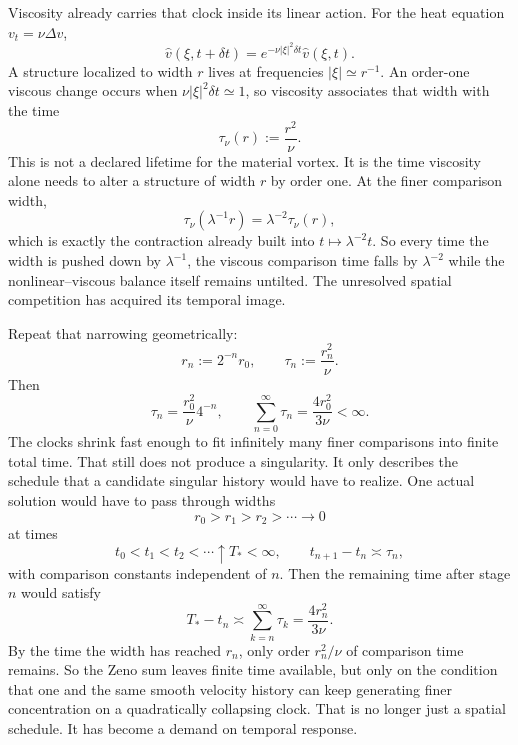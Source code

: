Viscosity already carries that clock inside its linear action.
For the heat equation \(v_t=\nu\Delta v\),
\[
  \widehat v(\xi,t+\delta t)
  =
  e^{-\nu|\xi|^2\delta t}\widehat v(\xi,t).
\]
A structure localized to width \(r\) lives at frequencies \(|\xi|\simeq r^{-1}\).
An order-one viscous change occurs when \(\nu|\xi|^2\delta t\simeq1\), so viscosity associates that width with the time
\[
  \tau_\nu(r)
  :=
  \frac{r^2}{\nu}.
\]
This is not a declared lifetime for the material vortex.
It is the time viscosity alone needs to alter a structure of width \(r\) by order one.
At the finer comparison width,
\[
  \tau_\nu(\lambda^{-1}r)
  =
  \lambda^{-2}\tau_\nu(r),
\]
which is exactly the contraction already built into \(t\mapsto\lambda^{-2}t\).
So every time the width is pushed down by \(\lambda^{-1}\), the viscous comparison time falls by \(\lambda^{-2}\) while the nonlinear--viscous balance itself remains untilted.
The unresolved spatial competition has acquired its temporal image.


Repeat that narrowing geometrically:
\[
  r_n:=2^{-n}r_0,
  \qquad
  \tau_n:=\frac{r_n^2}{\nu}.
\]
Then
\[
  \tau_n
  =
  \frac{r_0^2}{\nu}4^{-n},
  \qquad
  \sum_{n=0}^{\infty}\tau_n
  =
  \frac{4r_0^2}{3\nu}
  <
  \infty.
\]
The clocks shrink fast enough to fit infinitely many finer comparisons into finite total time.
That still does not produce a singularity.
It only describes the schedule that a candidate singular history would have to realize.
One actual solution would have to pass through widths
\[
  r_0>r_1>r_2>\cdots\longrightarrow0
\]
at times
\[
  t_0<t_1<t_2<\cdots\uparrow T_*<\infty,
  \qquad
  t_{n+1}-t_n\asymp\tau_n,
\]
with comparison constants independent of \(n\).
Then the remaining time after stage \(n\) would satisfy
\[
  T_*-t_n
  \asymp
  \sum_{k=n}^{\infty}\tau_k
  =
  \frac{4r_n^2}{3\nu}.
\]
By the time the width has reached \(r_n\), only order \(r_n^2/\nu\) of comparison time remains.
So the Zeno sum leaves finite time available, but only on the condition that one and the same smooth velocity history can keep generating finer concentration on a quadratically collapsing clock.
That is no longer just a spatial schedule.
It has become a demand on temporal response.